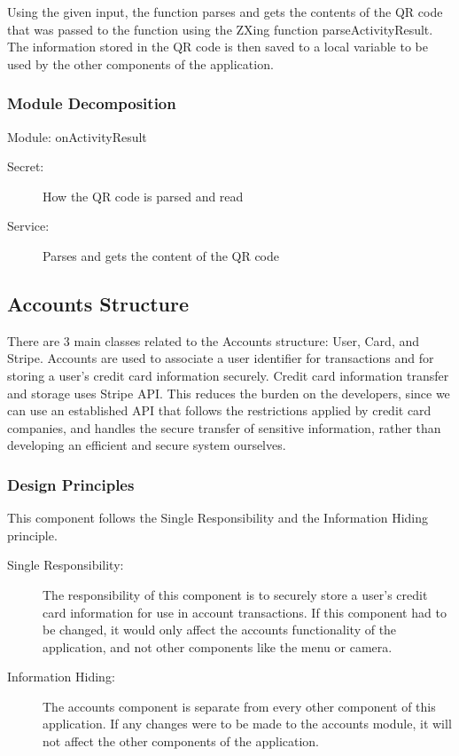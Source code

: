 \documentclass[12pt, titlepage]{article}
\begin{document}
Using the given input, the function parses and gets the contents of the QR code that was passed to the function using the ZXing function parseActivityResult. The information stored in the QR code is then saved to a local variable to be used by the other components of the application.

\subsubsection{Module Decomposition}
Module: onActivityResult
\begin{description}
	\item[Secret:]How the QR code is parsed and read
	\item[Service:] Parses and gets the content of the QR code
\end{description}

\subsection{Accounts Structure}
There are 3 main classes related to the Accounts structure: User, Card, and Stripe. Accounts are used to associate a user identifier for transactions and for storing a user's credit card information securely. Credit card information transfer and storage uses Stripe API. This reduces the burden on the developers, since we can use an established API that follows the restrictions applied by credit card companies, and handles the secure transfer of sensitive information, rather than developing an efficient and secure system ourselves.

\subsubsection{Design Principles}
This component follows the Single Responsibility and the Information Hiding principle.  

\begin{description}
	\item[Single Responsibility:] The responsibility of this component is to securely store a user's credit card information for use in account transactions. If this component had to be changed, it would only affect the accounts functionality of the application, and not other components like the menu or camera.
	\item[Information Hiding:] The accounts component is separate from every other component of this application. If any changes were to be made to the accounts module, it will not affect the other components of the application.
\end{description}
\end{document}
